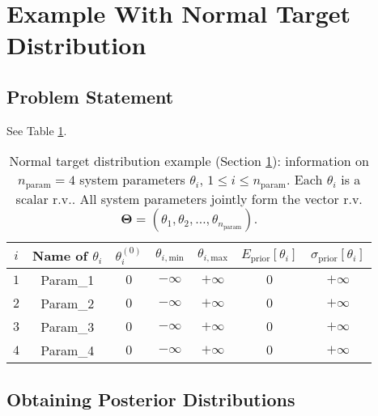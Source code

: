 \clearpage

\section{Example With Normal Target Distribution}\label{sc-gmc-dram-normal-ex}

\subsection{Problem Statement}

See Table \ref{tab-dram-normal-ex-sys-input-params}.

\begin{table}[h!]
\begin{center}
\begin{tabular}{|c|c|c|c|c|c|c|}
\hline
 $i$      & Name of $\theta_i$ & $\theta_i^{(0)}$ & $\theta_{i,\text{min}}$ & $\theta_{i,\text{max}}$ & $E_{\text{prior}}[\theta_i]$ & $\sigma_{\text{prior}}[\theta_i]$ \\
\hline
\hline
 $1$      & Param\_1           & $0$              & $-\infty$               & $+\infty$               & $0$                          & $+\infty$                    \\
\hline
 $2$      & Param\_2           & $0$              & $-\infty$               & $+\infty$               & $0$                          & $+\infty$                    \\
\hline
 $3$      & Param\_3           & $0$              & $-\infty$               & $+\infty$               & $0$                          & $+\infty$                    \\
\hline
 $4$      & Param\_4           & $0$              & $-\infty$               & $+\infty$               & $0$                          & $+\infty$                    \\
\hline
\end{tabular}
\caption{Normal target distribution example (Section \ref{sc-gmc-dram-normal-ex}):
information on $n_{\text{param}}=4$ system parameters $\theta_i$, $1\leqslant i\leqslant n_{\text{param}}$.
Each $\theta_i$ is a scalar r.v.. All system parameters jointly form the vector r.v. $\boldsymbol{\Theta}=(\theta_1,\theta_2,\ldots,\theta_{n_{\text{param}}})$.
}
\label{tab-dram-normal-ex-sys-input-params}
\end{center}
\end{table}

\subsection{Obtaining Posterior Distributions}

